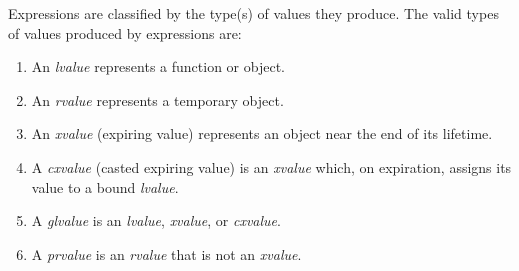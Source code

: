 \p Expressions are classified by the type(s) of values they produce. The valid
types of values produced by expressions are:

\begin{enumerate}
  \item An \textit{lvalue} represents a function or object.
  \item An \textit{rvalue} represents a temporary object.
  \item An \textit{xvalue} (expiring value) represents an object near the end
  of its lifetime.
  \item A \textit{cxvalue} (casted expiring value) is an \textit{xvalue}
  which, on expiration, assigns its value to a bound \textit{lvalue}.
  \item A \textit{glvalue} is an \textit{lvalue}, \textit{xvalue}, or
  \textit{cxvalue}.
  \item A \textit{prvalue} is an \textit{rvalue} that is not an \textit{xvalue}.
\end{enumerate}

